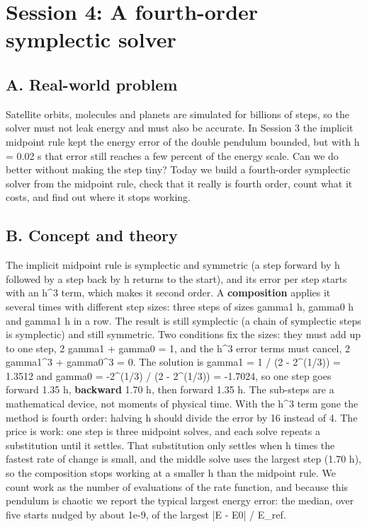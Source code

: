 \documentclass[11pt,a4paper]{article}
\begin{document}
\section{Session 4: A fourth-order symplectic solver}

\subsection*{A. Real-world problem}
Satellite orbits, molecules and planets are simulated for billions of steps, so the solver must not leak energy and must also be accurate. In Session 3 the implicit midpoint rule kept the energy error of the double pendulum bounded, but with h = 0.02 s that error still reaches a few percent of the energy scale. Can we do better without making the step tiny? Today we build a fourth-order symplectic solver from the midpoint rule, check that it really is fourth order, count what it costs, and find out where it stops working.

\subsection*{B. Concept and theory}
The implicit midpoint rule is symplectic and symmetric (a step forward by h followed by a step back by h returns to the start), and its error per step starts with an h\textasciicircum{}3 term, which makes it second order. A \textbf{composition} applies it several times with different step sizes: three steps of sizes gamma1 h, gamma0 h and gamma1 h in a row. The result is still symplectic (a chain of symplectic steps is symplectic) and still symmetric. Two conditions fix the sizes: they must add up to one step, 2 gamma1 + gamma0 = 1, and the h\textasciicircum{}3 error terms must cancel, 2 gamma1\textasciicircum{}3 + gamma0\textasciicircum{}3 = 0. The solution is gamma1 = 1 / (2 - 2\textasciicircum{}(1/3)) = 1.3512 and gamma0 = -2\textasciicircum{}(1/3) / (2 - 2\textasciicircum{}(1/3)) = -1.7024, so one step goes forward 1.35 h, \textbf{backward} 1.70 h, then forward 1.35 h. The sub-steps are a mathematical device, not moments of physical time. With the h\textasciicircum{}3 term gone the method is fourth order: halving h should divide the error by 16 instead of 4. The price is work: one step is three midpoint solves, and each solve repeats a substitution until it settles. That substitution only settles when h times the fastest rate of change is small, and the middle solve uses the largest step (1.70 h), so the composition stops working at a smaller h than the midpoint rule. We count work as the number of evaluations of the rate function, and because this pendulum is chaotic we report the typical largest energy error: the median, over five starts nudged by about 1e-9, of the largest |E - E0| / E\_ref.
\end{document}
